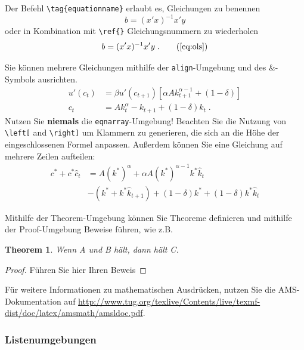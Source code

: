 \documentclass[a4paper,12pt]{scrartcl} %
\newtheorem{theorem}{Theorem} %
\begin{document}
Der Befehl \verb|\tag{equationname}| erlaubt es, Gleichungen zu benennen
\begin{equation}
	b = (x'x)^{-1}x'y \tag{OLS Estimator}
\end{equation}
oder in Kombination mit \verb|\ref{}| Gleichungsnummern zu wiederholen
\begin{equation}
	b = (x'x)^{-1}x'y \;. \tag{\ref{eq:ols}}
\end{equation}

Sie können mehrere Gleichungen mithilfe der \texttt{align}-Umgebung und des \&-Symbols ausrichten.
\begin{align}
	u'(c_t)&= \beta u'(c_{t+1}) \left[\alpha A k_{t+1}^{\alpha-1} +(1-\delta)\right] \label{euler}\\
    c_t &=Ak_t^{\alpha} - k_{t+1} + (1-\delta)k_t \;.\label{ressource}
\end{align}
Nutzen Sie \textbf{niemals} die \texttt{eqnarray}-Umgebung! Beachten Sie die Nutzung von \verb|\left[| and \verb|\right]| um Klammern zu generieren, die sich an die Höhe der eingeschlossenen Formel anpassen. Außerdem können Sie eine Gleichung auf mehrere Zeilen aufteilen:
\begin{equation}
	\begin{split}
        c^* + c^* \hat{c}_{t} &= A\left(k^*\right)^{\alpha} + \alpha A \left(k^*\right)^{\alpha-1} k^* \hat{k}_t \\
                              &- \left( k^* + k^* \hat{k}_{t+1}\right) + (1-\delta)k^* + (1-\delta) k^* \hat{k}_t
    \end{split}
\end{equation}

Mithilfe der Theorem-Umgebung können Sie Theoreme definieren und mithilfe der Proof-Umgebung Beweise führen, wie z.B.\
\begin{theorem}
Wenn A und B hält, dann hält C.
\end{theorem}

\begin{proof}
Führen Sie hier Ihren Beweis
\end{proof}

Für weitere Informationen zu mathematischen Ausdrücken, nutzen Sie die AMS-Dokumentation auf \url{http://www.tug.org/texlive/Contents/live/texmf-dist/doc/latex/amsmath/amsldoc.pdf}.

\subsubsection*{Listenumgebungen}
\end{document}
